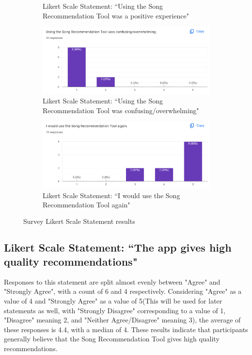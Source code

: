 \documentclass{l4proj}
\begin{document}
\begin{figure}
\begin{subfigure} [b] {0.49\textwidth}
        \caption{Likert Scale Statement: ``Using the Song Recommendation Tool was a positive experience"}
        \label{fig:Q9}
    \end{subfigure}
    \hfill
    \begin{subfigure} [b] {0.49\textwidth}
        \centering
        \includegraphics[width=1\textwidth]{images/Q10.png}
        \caption{Likert Scale Statement: ``Using the Song Recommendation Tool was confusing/overwhelming"}
        \label{fig:Q10}
    \end{subfigure}
    \hfill
    \begin{subfigure} [b] {0.49\textwidth}
        \centering
        \includegraphics[width=1\textwidth]{images/Q11.png}
        \caption{Likert Scale Statement: ``I would use the Song Recommendation Tool again"}
        \label{fig:Q11}
    \end{subfigure}
    \caption{Survey Likert Scale Statement results}
    \label{fig:LSQuestions}
\end{figure}
\subsection{Likert Scale Statement: ``The app gives high quality recommendations"}
Responses to this statement are split almost evenly between "Agree" and "Strongly Agree", with a count of 6 and 4 respectively. Considering "Agree" as a value of 4 and "Strongly Agree" as a value of 5(This will be used for later statements as well, with "Strongly Disagree" corresponding to a value of 1, "Disagree" meaning 2, and "Neither Agree/Disagree" meaning 3), the average of these responses is 4.4, with a median of 4. These results indicate that participants generally believe that the Song Recommendation Tool gives high quality recommendations.
\end{document}
